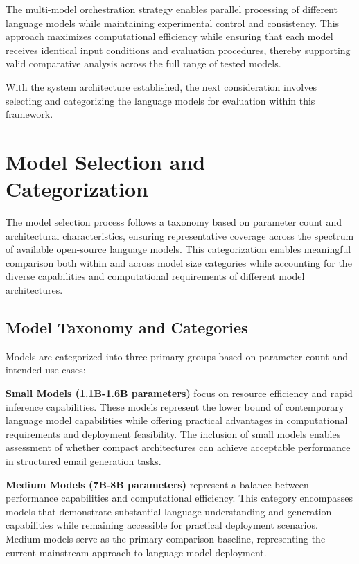 The multi-model orchestration strategy enables parallel processing of different language models while maintaining experimental control and consistency. This approach maximizes computational efficiency while ensuring that each model receives identical input conditions and evaluation procedures, thereby supporting valid comparative analysis across the full range of tested models.

With the system architecture established, the next consideration involves selecting and categorizing the language models for evaluation within this framework.

\section{Model Selection and Categorization}
\label{sec:model-selection}

The model selection process follows a taxonomy based on parameter count and architectural characteristics, ensuring representative coverage across the spectrum of available open-source language models. This categorization enables meaningful comparison both within and across model size categories while accounting for the diverse capabilities and computational requirements of different model architectures.

\subsection{Model Taxonomy and Categories}

Models are categorized into three primary groups based on parameter count and intended use cases:

\textbf{Small Models (1.1B-1.6B parameters)} focus on resource efficiency and rapid inference capabilities. These models represent the lower bound of contemporary language model capabilities while offering practical advantages in computational requirements and deployment feasibility. The inclusion of small models enables assessment of whether compact architectures can achieve acceptable performance in structured email generation tasks.

\textbf{Medium Models (7B-8B parameters)} represent a balance between performance capabilities and computational efficiency. This category encompasses models that demonstrate substantial language understanding and generation capabilities while remaining accessible for practical deployment scenarios. Medium models serve as the primary comparison baseline, representing the current mainstream approach to language model deployment.

